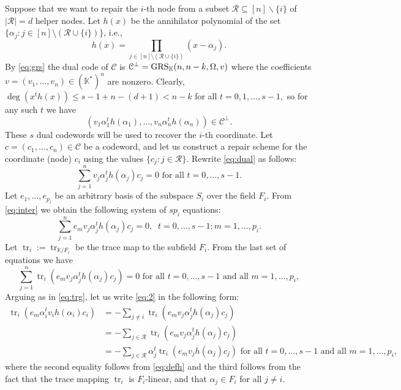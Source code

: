 \documentclass[11pt,onecolumn]{IEEEtran}
\newcommand{\cC}{\mathcal{C}}
\newcommand{\cR}{\mathcal{R}}
\DeclareMathOperator{\trace}{tr}
\begin{document}
\begin{IEEEproof}
Suppose that we want to repair the $i$-th node from a subset $\cR\subseteq [n]\backslash\{i\}$ of 
$|\cR|=d$ helper nodes. 
Let $h(x)$ be the annihilator polynomial of the set $\{\alpha_j: j\in[n]\setminus (\cR\cup\{i\}) \}$, i.e., 
\begin{equation}\label{eq:defh}
h(x)=\prod_{j\in[n]\setminus (\cR\cup\{i\})}(x-\alpha_j).
\end{equation}
By \eqref{eq:grs} the dual code of $\cC$ is $\cC^\bot=\text{\rm GRS}_{\mathbb{K}}(n,n-k,\Omega,v)$ where the coefficients  
$v=(v_1,\dots,v_n) \in (\mathbb{K}^*)^n$ are nonzero.
Clearly, $\deg(x^th(x))\leq s-1+n-(d+1)<n-k$ for all $t=0,1,\dots,s-1,$ so for any such $t$ we have
\begin{equation}\label{eq:dual}
(v_1\alpha_1^t h(\alpha_1),\dots,v_n \alpha_n^t h(\alpha_n))\in\cC^\bot.
\end{equation}
These $s$ dual codewords will  be used to recover the $i$-th coordinate. 
Let $c=(c_1,\dots,c_n)\in \cC$ be a codeword, and let us construct a repair scheme for the coordinate (node) $c_i$ using
the values $\{c_j:j\in \cR\}$. Rewrite \eqref{eq:dual} as follows:
\begin{equation}\label{eq:inter}
\sum_{j=1}^n  v_j\alpha_j^t h(\alpha_j) c_j =0 \text{~for all~}  t=0,\dots,s-1.
\end{equation}
Let $e_1,\dots,e_{p_i}$ be an arbitrary basis of the subspace $S_i$ over the field $F_i$. From \eqref{eq:inter} we obtain the
following system of $sp_i$ equations:
$$
\sum_{j=1}^n  e_m v_j\alpha_j^t h(\alpha_j) c_j =0,\;\;   t=0,\dots,s-1;
m=1,\dots,p_i.
$$
Let $\trace_i:=\trace_{\mathbb{K}/F_i}$ be the trace map to the subfield $F_i$. From the last set of equations we have
\begin{equation}\label{eq:2}
\sum_{j=1}^n\trace_i(e_mv_j\alpha_j^th(\alpha_j)c_j)=0 \text{~for all~} t=0,\dots,s-1 \text{~and all~} m=1,\dots,p_i,
\end{equation}
Arguing as in \eqref{eq:trg}, let us write \eqref{eq:2} in the following form:
\begin{equation}\label{eq:rcv}
\begin{aligned}
\trace_i(e_m \alpha_i^t v_i h(\alpha_i)c_i) & = - \sum_{j\neq i} \trace_i(e_mv_j\alpha_j^th(\alpha_j)c_j) \\
& = - \sum_{j\in \cR} \trace_i(e_m v_j \alpha_j^t h(\alpha_j)c_j) \\
& = - \sum_{j\in \cR} \alpha_j^t\trace_i(e_m v_j  h(\alpha_j)c_j)
\text{~for all~} t=0,\dots,s-1 \text{~and all~} m=1,\dots,p_i,
\end{aligned}
\end{equation}
where the second equality follows from \eqref{eq:defh} and the third follows from the fact that the trace mapping $\trace_i$ is $F_i$-linear, and that $\alpha_j\in F_i$ for all $j \neq i$.


\end{IEEEproof}
\end{document}
